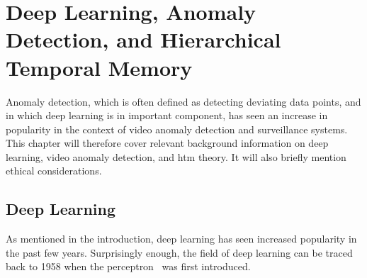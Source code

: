 \chapter{Deep Learning, Anomaly Detection, and Hierarchical Temporal Memory}
\label{sec:background}
Anomaly detection, which is often defined as detecting deviating data points, and in which deep learning is in important component, has seen an increase in popularity in the context of video anomaly detection and surveillance systems. This chapter will therefore cover relevant background information on deep learning, video anomaly detection, and \gls*{htm} theory. It will also briefly mention ethical considerations.
\section{Deep Learning}
As mentioned in the introduction, deep learning has seen increased popularity in the past few years. Surprisingly enough, the field of deep learning can be traced back to 1958 when the perceptron~\cite{perceptron,perceptron2} was first introduced.
